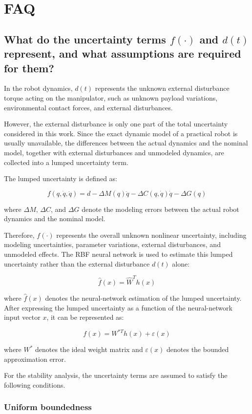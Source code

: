 \section{FAQ}

\subsection{What do the uncertainty terms $f(\cdot)$ and $d(t)$ represent, and what assumptions are required for them?}

In the robot dynamics, $d(t)$ represents the unknown external disturbance torque acting on the manipulator, such as unknown payload variations, environmental contact forces, and external disturbances.

However, the external disturbance is only one part of the total uncertainty considered in this work. Since the exact dynamic model of a practical robot is usually unavailable, the differences between the actual dynamics and the nominal model, together with external disturbances and unmodeled dynamics, are collected into a lumped uncertainty term.

The lumped uncertainty is defined as:

\[
f(q,\dot q,\ddot q)
=
d
-\Delta M(q)\ddot q
-\Delta C(q,\dot q)\dot q
-\Delta G(q)
\]

where $\Delta M$, $\Delta C$, and $\Delta G$ denote the modeling errors between the actual robot dynamics and the nominal model.

Therefore, $f(\cdot)$ represents the overall unknown nonlinear uncertainty, including modeling uncertainties, parameter variations, external disturbances, and unmodeled effects. The RBF neural network is used to estimate this lumped uncertainty rather than the external disturbance $d(t)$ alone:

\[
\hat f(x)=\hat W^T h(x)
\]

where $\hat f(x)$ denotes the neural-network estimation of the lumped uncertainty. After expressing the lumped uncertainty as a function of the neural-network input vector $x$, it can be represented as:

\[
f(x)=W^{*T}h(x)+\varepsilon(x)
\]

where $W^*$ denotes the ideal weight matrix and $\varepsilon(x)$ denotes the bounded approximation error.


For the stability analysis, the uncertainty terms are assumed to satisfy the following conditions.

\subsubsection{Uniform boundedness}

